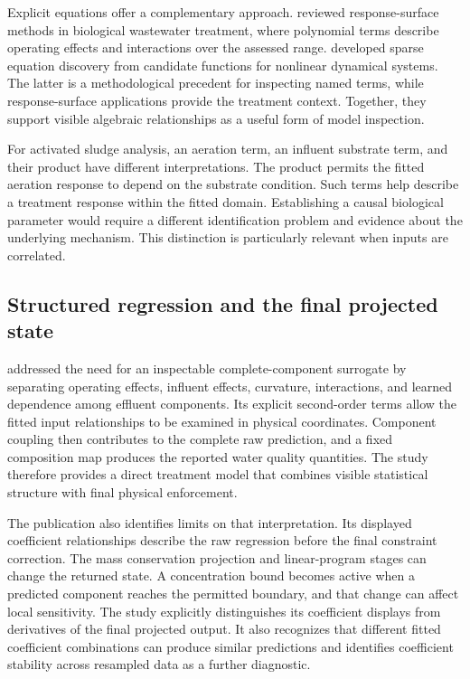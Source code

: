 Explicit equations offer a complementary approach. \citet{Nazlabadi2021} reviewed response-surface methods in biological wastewater treatment, where polynomial terms describe operating effects and interactions over the assessed range. \citet{Brunton2016} developed sparse equation discovery from candidate functions for nonlinear dynamical systems. The latter is a methodological precedent for inspecting named terms, while response-surface applications provide the treatment context. Together, they support visible algebraic relationships as a useful form of model inspection.

For activated sludge analysis, an aeration term, an influent substrate term, and their product have different interpretations. The product permits the fitted aeration response to depend on the substrate condition. Such terms help describe a treatment response within the fitted domain. Establishing a causal biological parameter would require a different identification problem and evidence about the underlying mechanism. This distinction is particularly relevant when inputs are correlated.

\subsection{Structured regression and the final projected state}

\citet{Selerio2026} addressed the need for an inspectable complete-component surrogate by separating operating effects, influent effects, curvature, interactions, and learned dependence among effluent components. Its explicit second-order terms allow the fitted input relationships to be examined in physical coordinates. Component coupling then contributes to the complete raw prediction, and a fixed composition map produces the reported water quality quantities. The study therefore provides a direct treatment model that combines visible statistical structure with final physical enforcement.

The publication also identifies limits on that interpretation. Its displayed coefficient relationships describe the raw regression before the final constraint correction. The mass conservation projection and linear-program stages can change the returned state. A concentration bound becomes active when a predicted component reaches the permitted boundary, and that change can affect local sensitivity. The study explicitly distinguishes its coefficient displays from derivatives of the final projected output. It also recognizes that different fitted coefficient combinations can produce similar predictions and identifies coefficient stability across resampled data as a further diagnostic.

